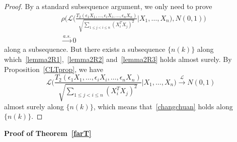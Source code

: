 \documentclass[review]{elsarticle}
\theoremstyle{plain}
\theoremstyle{definition}
\theoremstyle{remark}
\begin{document}
\begin{proof}
By a standard subsequence argument, we only need to prove 
    \begin{equation}\label{changchuan}
        \begin{aligned}
            &\rho\Big(\mathcal{L}\Big(\frac{T_2(\epsilon_1 X_1,\ldots, \epsilon_i X_i,\ldots,\epsilon_n X_n)}{\sqrt{\sum_{1\leq j<i\leq n}{(X_i^T X_j)}^2}}\Big|X_1,\ldots,X_n\Big),N(0,1)\Big)\\
            &\xrightarrow{a.s.} 0
        \end{aligned}
    \end{equation}
     along a subsequence.
    But there exists a subsequence $\{n(k)\}$ along which~\eqref{lemma2R1},~\eqref{lemma2R2} and~\eqref{lemma2R3} holds almost surely.
    By Proposition~\ref{CLTprop}, we have
    \begin{equation*}
        \mathcal{L}\Big(\frac{T_2(\epsilon_1 X_1,\ldots, \epsilon_i X_i,\ldots,\epsilon_n X_n)}{\sqrt{\sum_{1\leq j<i\leq n}{(X_i^T X_j)}^2}}\Big|X_1,\ldots,X_n\Big)\xrightarrow{\mathcal{L}}N(0,1)
    \end{equation*}
    almost surely along $\{n(k)\}$, which means that~\eqref{changchuan} holds along $\{n(k)\}$.

\end{proof}


\textbf{Proof of Theorem~\ref{farT}}
\end{document}
